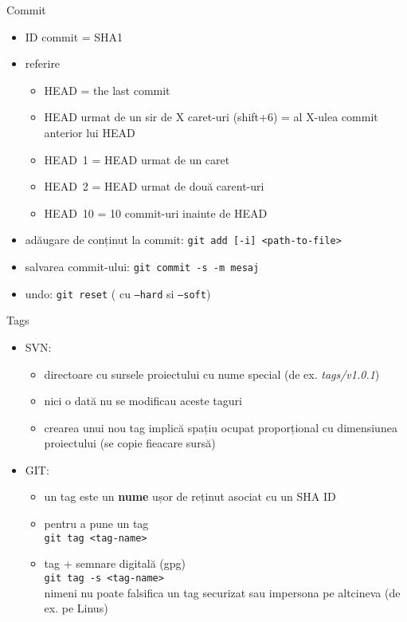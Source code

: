 \documentclass{beamer}
\begin{document}
\begin{frame}{Commit}
\begin{itemize} %
\item ID commit = SHA1
\item referire
\begin{itemize}
	\item HEAD = the last commit
	\item HEAD urmat de un sir de X caret-uri (shift+6) = al X-ulea commit anterior lui HEAD
	\item HEAD~1 = HEAD urmat de un caret
    \item HEAD~2 = HEAD urmat de două carent-uri
    \item HEAD~10 = 10 commit-uri inainte de HEAD
\end{itemize}
\pause\item adăugare de conținut la commit: \texttt{git add [-i] <path-to-file>}
\item salvarea commit-ului: \texttt{git commit -s -m mesaj}
\item undo: \texttt{git reset} ( cu \texttt{--hard} si \texttt{--soft})
\end{itemize}
\end{frame}


\begin{frame}{Tags}
\begin{itemize}
\item SVN:
  \begin{itemize}
  \item directoare cu sursele proiectului cu nume special
    (de ex. \textit{tags/v1.0.1})
  \item nici o dată nu se modificau aceste taguri
  \item crearea unui nou tag implică spațiu ocupat proporțional cu 
    dimensiunea proiectului (se copie fieacare sursă)
  \end{itemize}
\item GIT:
  \begin{itemize}
  \item un tag este un \textbf{nume} ușor de reținut asociat cu un SHA ID
  \item pentru a pune un tag \\ 
    \texttt{git tag <tag-name>}
  \item tag + semnare digitală (gpg) \\ 
    \texttt{git tag -s <tag-name>}   \\
    nimeni nu poate falsifica un tag securizat sau impersona pe altcineva (de ex. pe Linus)
  \end{itemize}
\end{itemize}
\end{frame}
\end{document}
